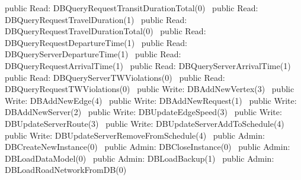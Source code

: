 public \LA{}Read: DBQueryRequestTransitDurationTotal(0)~{\nwtagstyle{}}\RA{}
public \LA{}Read: DBQueryRequestTravelDuration(1)~{\nwtagstyle{}}\RA{}
public \LA{}Read: DBQueryRequestTravelDurationTotal(0)~{\nwtagstyle{}}\RA{}
public \LA{}Read: DBQueryRequestDepartureTime(1)~{\nwtagstyle{}}\RA{}
public \LA{}Read: DBQueryServerDepartureTime(1)~{\nwtagstyle{}}\RA{}
public \LA{}Read: DBQueryRequestArrivalTime(1)~{\nwtagstyle{}}\RA{}
public \LA{}Read: DBQueryServerArrivalTime(1)~{\nwtagstyle{}}\RA{}
public \LA{}Read: DBQueryServerTWViolations(0)~{\nwtagstyle{}}\RA{}
public \LA{}Read: DBQueryRequestTWViolations(0)~{\nwtagstyle{}}\RA{}
\nwendcode{}\nwdocspar
{}
\nwenddocs{}\plusendmoddef
public \LA{}Write: DBAddNewVertex(3)~{\nwtagstyle{}}\RA{}
public \LA{}Write: DBAddNewEdge(4)~{\nwtagstyle{}}\RA{}
public \LA{}Write: DBAddNewRequest(1)~{\nwtagstyle{}}\RA{}
public \LA{}Write: DBAddNewServer(2)~{\nwtagstyle{}}\RA{}
public \LA{}Write: DBUpdateEdgeSpeed(3)~{\nwtagstyle{}}\RA{}
public \LA{}Write: DBUpdateServerRoute(3)~{\nwtagstyle{}}\RA{}
public \LA{}Write: DBUpdateServerAddToSchedule(4)~{\nwtagstyle{}}\RA{}
public \LA{}Write: DBUpdateServerRemoveFromSchedule(4)~{\nwtagstyle{}}\RA{}
\nwendcode{}\nwdocspar
{}
\nwenddocs{}\plusendmoddef
public \LA{}Admin: DBCreateNewInstance(0)~{\nwtagstyle{}}\RA{}
public \LA{}Admin: DBCloseInstance(0)~{\nwtagstyle{}}\RA{}
public \LA{}Admin: DBLoadDataModel(0)~{\nwtagstyle{}}\RA{}
public \LA{}Admin: DBLoadBackup(1)~{\nwtagstyle{}}\RA{}
public \LA{}Admin: DBLoadRoadNetworkFromDB(0)~{\nwtagstyle{}}\RA{}
